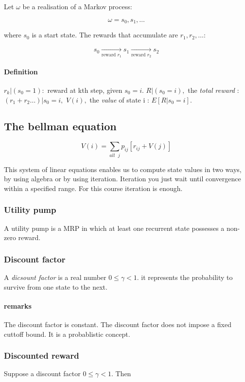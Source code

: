 \documentclass{article}
\begin{document}
Let $\omega$ be a realisation of a Markov process:

\[\omega = s_0, s_1, \dots\]

where $s_0$ is a start state.
The rewards that accumulate are $r_1, r_2, \dots$:

\[ s_0 \xrightarrow[\mbox{reward } r_1]{} s_1 \xrightarrow[\mbox{reward } r_2]{} s_2\]

\paragraph{Definition}

$r_k | (s_0=1) : $ reward at kth step, given $s_0 = i$.
$R|(s_0=i),$ the \emph{total reward} : $(r_1 + r_2 \dots)|s_0=i,$
$V(i),$ the \emph{value} of state i : $E[R|s_0=i]$.

\subsection{The bellman equation}

\[V(i)=\sum_{all\mbox{\ }j} p_{ij}[r_{ij} + V(j)]\]

This system of linear equations enables us to compute state values in two
ways, by using algebra or by using iteration. Iteration you just wait until
convergence within a specified range. For this course iteration is enough.

\subsubsection{Utility pump}
A utility pump is a MRP in which at least one recurrent state possesses a
non-zero reward.
\subsubsection{Discount factor}
A \emph{dicsount factor} is a real number $0 \le \gamma < 1$. it represents
the probability to survive from one state to the next.

\paragraph{remarks} The discount factor is constant. The discount factor
does not impose a fixed cuttoff bound. It is a probablistic concept.

\subsubsection{Discounted reward}
Suppose a discount factor $0 \le \gamma < 1$. Then
\end{document}
